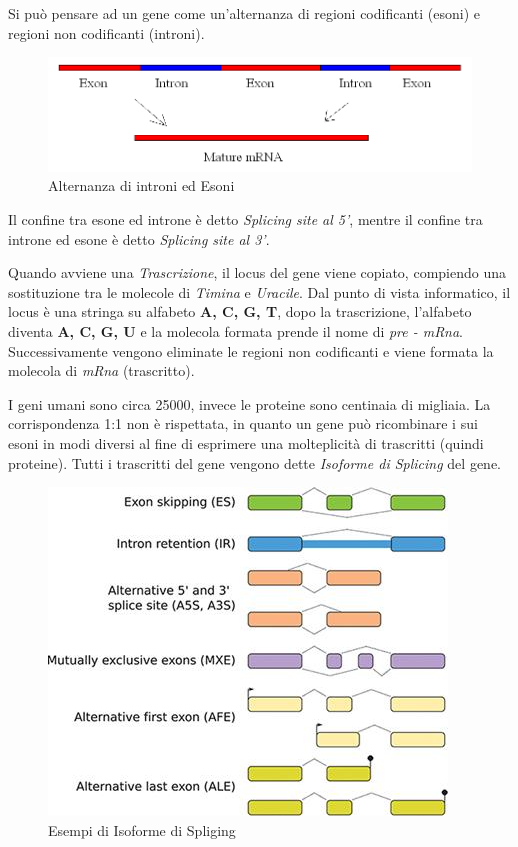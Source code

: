 Si può pensare ad un gene come un'alternanza di regioni codificanti (esoni) e regioni non codificanti (introni).

\begin{figure}[ht]
    \centering
    \includegraphics[scale=0.3]{images/introns - exons.jpg}
    \caption{Alternanza di introni ed Esoni}
    \label{fig:intron-exon}
\end{figure}

Il confine tra esone ed introne è detto \textit{Splicing site al 5'}, mentre il confine tra introne ed esone è detto \textit{Splicing site al 3'}.

Quando avviene una \textit{Trascrizione}, il locus del gene viene copiato, compiendo una sostituzione tra le molecole di \textit{Timina} e \textit{Uracile}. Dal punto di vista informatico, il locus è una stringa su alfabeto \textbf{A, C, G, T}, dopo la trascrizione, l'alfabeto diventa \textbf{A, C, G, U} e la molecola formata prende il nome di \newline \textit{pre - mRna}. Successivamente vengono eliminate le regioni non codificanti e viene formata la molecola di \textit{mRna} (trascritto).


I geni umani sono circa 25000, invece le proteine sono centinaia di migliaia. La corrispondenza 1:1 non è rispettata, in quanto un gene può ricombinare i sui esoni in modi diversi al fine di esprimere una molteplicità di trascritti (quindi proteine).
Tutti i trascritti del gene vengono dette \textit{Isoforme di Splicing} del gene.  

\begin{figure}[ht]
    \centering
    \includegraphics[scale=0.6]{images/alternative splicing.jpg}
    \caption{Esempi di Isoforme di Spliging}
    \label{fig:slicing}
\end{figure}

